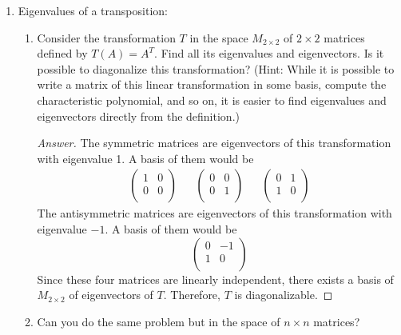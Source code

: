 \documentclass[../psets.tex]{subfiles}
\begin{document}
\begin{enumerate}[label={\textbf{2.\arabic*.}}]
    \item Eigenvalues of a transposition:
    \begin{enumerate}
        \item Consider the transformation $T$ in the space $M_{2\times 2}$ of $2\times 2$ matrices defined by $T(A)=A^T$. Find all its eigenvalues and eigenvectors. Is it possible to diagonalize this transformation? (Hint: While it is possible to write a matrix of this linear transformation in some basis, compute the characteristic polynomial, and so on, it is easier to find eigenvalues and eigenvectors directly from the definition.)
        \begin{proof}[Answer]
            The symmetric matrices are eigenvectors of this transformation with eigenvalue 1. A basis of them would be
            \begin{align*}
                \begin{pmatrix}
                    1 & 0\\
                    0 & 0\\
                \end{pmatrix}&&
                \begin{pmatrix}
                    0 & 0\\
                    0 & 1\\
                \end{pmatrix}&&
                \begin{pmatrix}
                    0 & 1\\
                    1 & 0\\
                \end{pmatrix}
            \end{align*}
            The antisymmetric matrices are eigenvectors of this transformation with eigenvalue $-1$. A basis of them would be
            \begin{equation*}
                \begin{pmatrix}
                    0 & -1\\
                    1 & 0\\
                \end{pmatrix}
            \end{equation*}
            Since these four matrices are linearly independent, there exists a basis of $M_{2\times 2}$ of eigenvectors of $T$. Therefore, $T$ is diagonalizable.
        \end{proof}
        \item Can you do the same problem but in the space of $n\times n$ matrices?

\end{enumerate}
\end{enumerate}
\end{document}

